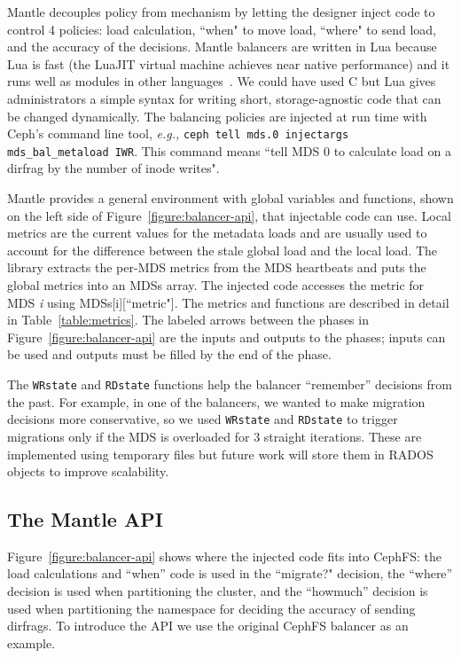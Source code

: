 Mantle decouples policy from mechanism by letting the designer inject code to control 4 policies: load calculation, ``when" to move load, ``where" to send load, and the accuracy of the decisions. Mantle balancers are written in Lua because Lua is fast (the LuaJIT virtual machine achieves near native performance) and it runs well as modules in other languages~\cite{grawinkel:pdsw2012-lua}. We could have used C but Lua gives administrators a simple syntax for writing short, storage-agnostic code that can be changed dynamically. The balancing policies are injected at run time with Ceph's command line tool, {\it e.g.,} \texttt{\small ceph tell mds.0 injectargs mds\_bal\_metaload IWR}. This command means ``tell MDS 0 to calculate load on a dirfrag by the number of inode writes".

Mantle provides a general environment with global variables and functions, shown on the left side of Figure~\ref{figure:balancer-api}, that injectable code can use. Local metrics are the current values for the metadata loads and are usually used to account for the difference between the stale global load and the local load. The library extracts the per-MDS metrics from the MDS heartbeats and puts the global metrics into an MDSs array. The injected code accesses the metric for MDS {\it i} using MDSs[i][``metric"]. The metrics and functions are described in detail in Table~\ref{table:metrics}. The labeled arrows between the phases in Figure~\ref{figure:balancer-api} are the inputs and outputs to the phases; inputs can be used and outputs must be filled by the end of the phase.

The \texttt{WRstate} and \texttt{RDstate} functions help the balancer ``remember'' decisions from the past. For example, in one of the balancers, we wanted to make migration decisions more conservative, so we used \texttt{WRstate} and \texttt{RDstate} to trigger migrations only if the MDS is overloaded for 3 straight iterations. These are implemented using temporary files but future work will store them in RADOS objects to improve scalability.

\subsection{The Mantle API}
\label{the-mantle-api}
Figure~\ref{figure:balancer-api} shows where the injected code fits into CephFS: the load calculations and ``when'' code is used in the ``migrate?" decision, the ``where'' decision is used when partitioning the cluster, and the ``howmuch'' decision is used when partitioning the namespace for deciding the accuracy of sending dirfrags. To introduce the API we use the original CephFS balancer as an example. 


